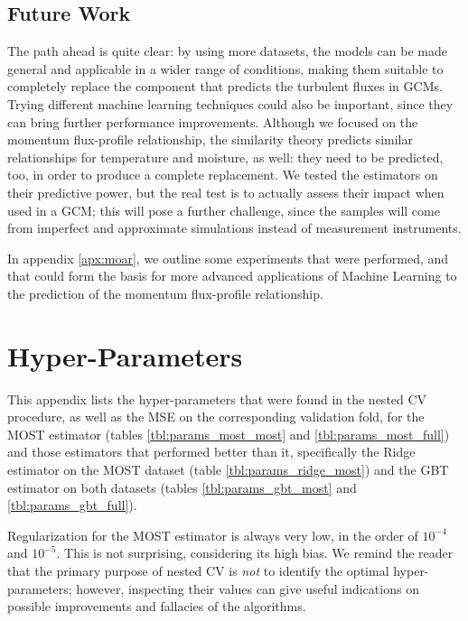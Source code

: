\documentclass[a4paper,11pt]{kth-mag}
\begin{document}
\section{Future Work}
\label{sec:future_work}
The path ahead is quite clear: by using more datasets, the models can be made general and applicable in a wider range of conditions, making them suitable to completely replace the component that predicts the turbulent fluxes in GCMs. Trying different machine learning techniques could also be important, since they can bring further performance improvements. Although we focused on the momentum flux-profile relationship, the similarity theory predicts similar relationships for temperature and moisture, as well: they need to be predicted, too, in order to produce a complete replacement. We tested the estimators on their predictive power, but the real test is to actually assess their impact when used in a GCM; this will pose a further challenge, since the samples will come from imperfect and approximate simulations instead of measurement instruments.

In appendix \ref{apx:moar}, we outline some experiments that were performed, and that could form the basis for more advanced applications of Machine Learning to the prediction of the momentum flux-profile relationship.

\appendix
\addappheadtotoc

\chapter{Hyper-Parameters}
\label{apx:hyps}

This appendix lists the hyper-parameters that were found in the nested CV procedure, as well as the MSE on the corresponding validation fold, for the MOST estimator (tables \ref{tbl:params_most_most} and \ref{tbl:params_most_full}) and those estimators that performed better than it, specifically the Ridge estimator on the MOST dataset (table \ref{tbl:params_ridge_most}) and the GBT estimator on both datasets (tables \ref{tbl:params_gbt_most} and \ref{tbl:params_gbt_full}).

Regularization for the MOST estimator is always very low, in the order of $10^{-4}$ and $10^{-5}$. This is not surprising, considering its high bias. We remind the reader that the primary purpose of nested CV is \emph{not} to identify the optimal hyper-parameters; however, inspecting their values can give useful indications on possible improvements and fallacies of the algorithms.
\end{document}
